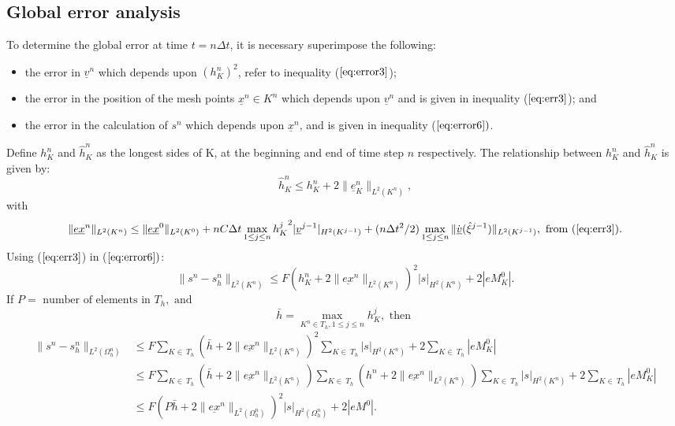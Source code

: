 \documentclass[11pt]{article}
\newcommand{\D}{\Delta}
\newcommand{\ul}{\underline}
\newcommand{\Om}{\Omega}
\begin{document}
\subsection{Global error analysis}
To determine the global error at time $t=n\D{t}$, it is necessary superimpose the following:
\begin{itemize}
\item the error in $\ul{v}^n$ which depends upon $(h_K^n)^2$, refer to inequality ($\ref{eq:error3}$); 
\item the error in the position of the mesh points $\ul{x}^n\in K^n$ which depends upon $\ul{v}^n$ and is given in inequality ($\ref{eq:err3}$); and
\item the error in the calculation of $s^n$ which depends upon $\ul{x}^n$, and is given in inequality ($\ref{eq:error6})$. 
\end{itemize}
Define $h_K^n$ and $\hat{h}_K^n$ as the longest sides of K, at the beginning and end of time step $n$ respectively. The relationship between 
 $h_K^n$ and $\hat{h}_K^n$ is given by:
 \begin{equation}
 \label{eq:hrel}
 \hat{h}_K^n \leq h_K^n + 2\|\ul{e}_K^n\|_{L^{2}(K^n)},
 \end{equation}
 with $$\|\ul{ex}^{n}\|_{L^{2}(K^n)} \leq \| \ul{ex}^0\|_{L^{2}(K^0)} + nC\D{t}\max_{1 \leq j \leq n}{h_K^j}^2|\ul{v}^{j-1}|_{H^2(K^{j-1})}  + ( n\D{t}^2/2)\max_{1\leq j \leq n}\|\dot{\ul{v}}(\hat{\xi}^{j-1})\|_{L^{2}(K^{j-1})}, \text{ from }  (\ref{eq:err3}).$$
 Using ($\ref{eq:err3}$) in ($\ref{eq:error6})$:
\begin{equation}
\label{eq:error7}
\|s^n-s_h^n\|_{L^2(K^n)} \leq F( h_K^n + 2\|\ul{ex}^n\|_{L^{2}(K^n)}  )^2|s|_{H^2(K^n)} + 2|eM_K^0|.
\end{equation}
If $P = \text{ number of elements in } T_h, \text{ and }$ $$\bar{h} = \max_{ K^n\in{T_h}, 1\leq{j}\leq{n} }h_K^j, \text{ then }$$
\begin{align*} 
\|s^n-s_h^n\|_{L^2(\Om_h^n)} & \leq F\sum_{K\in\ T_h}( \bar{h} + 2\|\ul{ex}^n\|_{L^{2}(K^n)}  )^2\sum_{K\in\ T_h}|s|_{H^2(K^n)} + 2\sum_{K\in\ T_h}|eM_K^0|\\ 
& \leq F\sum_{K\in\ T_h}( \bar{h} + 2\|\ul{ex}^n\|_{L^{2}(K^n)}  )\sum_{K\in\ T_h}( h^n + 2\|\ul{ex}^n\|_{L^{2}(K^n)}  )\sum_{K\in\ T_h}|s|_{H^2(K^n)} + 2\sum_{K\in\ T_h}|eM_K^0| \\ 
& \leq F\left(P\bar{h}+2\|\ul{ex}^n\|_{L^2(\Om^n_h)}\right)^2|s|_{H^2(\Om^n_h)} + 2|eM^0|.\\ 
\end{align*}
\end{document}
